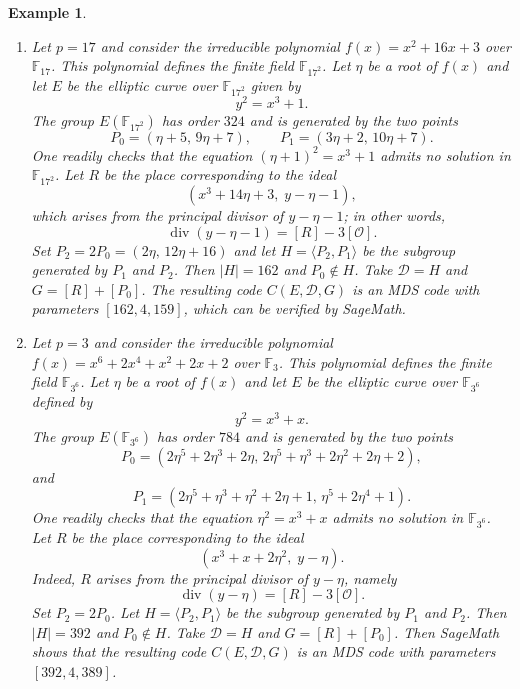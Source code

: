 \documentclass[journal,12pt,onecolumn]{IEEEtran}
\newtheorem{example}[theorem]{Example}
\begin{document}
\begin{example}
\begin{enumerate}
    \item Let $p = 17$ and consider the irreducible polynomial $f(x) = x^2 + 16x + 3$ over $\mathbb{F}_{17}$. This polynomial defines the finite field $\mathbb{F}_{17^2}$. Let $\eta$ be a root of $f(x)$ and let $E$ be the elliptic curve over $\mathbb{F}_{17^2}$ given by
    \[
    y^2 = x^3 + 1.
    \]
    The group $E(\mathbb{F}_{17^2})$ has order $324$ and is generated by the two points
    \[
    P_0 = (\eta + 5,\, 9\eta + 7), \qquad P_1 = (3\eta + 2,\, 10\eta + 7).
    \]
    One readily checks that the equation $(\eta+1)^2 = x^3 + 1$ admits no solution in $\mathbb{F}_{17^2}$. Let $R$ be the place corresponding to the ideal
    \[
    (x^3 + 14\eta + 3,\; y - \eta - 1),
    \]
    which arises from the principal divisor of $y - \eta - 1$; in other words,
    \[
    \operatorname{div}(y - \eta - 1) = [R] - 3[\mathcal{O}].
    \]
    Set $P_2 = 2P_0 = (2\eta,\, 12\eta + 16)$ and let $H = \langle P_2, P_1 \rangle$ be the subgroup generated by $P_1$ and $P_2$. Then $|H| = 162$ and $P_0 \notin H$. Take $\mathcal{D} = H$ and $G = [R] + [P_0]$. The resulting code $C(E, \mathcal{D}, G)$ is an MDS code with parameters $[162,4,159]$, which can be verified by SageMath.

    \item Let $p = 3$ and consider the irreducible polynomial $f(x) = x^6 + 2x^4 + x^2 + 2x + 2$ over $\mathbb{F}_{3}$. This polynomial defines the finite field $\mathbb{F}_{3^6}$. Let $\eta$ be a root of $f(x)$ and let $E$ be the elliptic curve over $\mathbb{F}_{3^6}$ defined by
    \[
    y^2 = x^3 + x.
    \]
    The group $E(\mathbb{F}_{3^6})$ has order $784$ and is generated by the two points
    \[
    P_0 = (2\eta^5 + 2\eta^3 + 2\eta,\, 2\eta^5 + \eta^3 + 2\eta^2 + 2\eta + 2), \]
    and 
    \[
    P_1 = (2\eta^5 + \eta^3 + \eta^2 + 2\eta + 1,\, \eta^5 + 2\eta^4 + 1).
    \]
    One readily checks that the equation $\eta^2 = x^3 + x$ admits no solution in $\mathbb{F}_{3^6}$. Let $R$ be the place corresponding to the ideal
    \[
    (x^3 + x + 2\eta^2,\; y - \eta).
    \]
    Indeed, $R$ arises from the principal divisor of $y - \eta$, namely
    \[
    \operatorname{div}(y - \eta) = [R] - 3[\mathcal{O}].
    \]
    Set $P_2 = 2P_0$.
    Let $H = \langle P_2, P_1 \rangle$ be the subgroup generated by $P_1$ and $P_2$. Then $|H| = 392$ and $P_0 \notin H$. Take $\mathcal{D} = H$ and $G = [R] + [P_0]$. Then SageMath shows that the resulting code $C(E, \mathcal{D}, G)$ is an MDS code with parameters $[392,4,389]$.
\end{enumerate}
\end{example}
\end{document}
